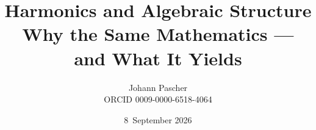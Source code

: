 \documentclass[11pt,a4paper]{report}
\title{Harmonics and Algebraic Structure\\[0.5em]
  \large Why the Same Mathematics --- and What It Yields}
\date{8~September 2026}
\author{Johann Pascher\\\small ORCID 0009-0000-6518-4064}
\begin{document}
\renewcommand{\thechapter}{}
\renewcommand{\thesection}{\arabic{section}}
\maketitle
\tableofcontents

\end{document}
